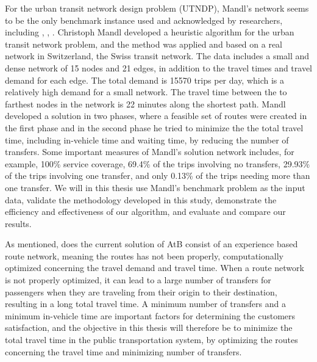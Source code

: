 For the urban transit network design problem (UTNDP), Mandl's network seems to be the only benchmark instance used and acknowledged by researchers, including \citep{fan09}, \citep{kechagiopoulos14}, \citep{nikolic14}. Christoph Mandl \citep{mandl79} developed a heuristic algorithm for the urban transit network problem, and the method was applied and based on a real network in Switzerland, the Swiss transit network\citep{mandl80}. The data includes a small and dense network of 15 nodes and 21 edges, in addition to the travel times and travel demand for each edge. The total demand is 15570 trips per day, which is a relatively high demand for a small network. The travel time between the to farthest nodes in the network is 22 minutes along the shortest path. Mandl developed a solution in two phases, where a feasible set of routes were created in the first phase and in the second phase he tried to minimize the the total travel time, including in-vehicle time and waiting time, by reducing the number of transfers. Some important measures of Mandl's solution network includes, for example, 100\% service coverage, 69.4\% of the trips involving no transfers, 29.93\% of the trips involving one transfer, and only 0.13\% of the trips needing more than one transfer. We will in this thesis use Mandl's benchmark problem \citep{mandl79} as the input data, validate the methodology developed in this study, demonstrate the efficiency and effectiveness of our algorithm, and evaluate and compare our results. 


As mentioned, does the current solution of AtB consist of an experience based route network, meaning the routes has not been properly, computationally optimized concerning the travel demand and travel time. When a route network is not properly optimized, it can lead to a large number of transfers for passengers when they are traveling from their origin to their destination, resulting in a long total travel time. A minimum number of transfers and a minimum in-vehicle time are important factors for determining the customers satisfaction, and the objective in this thesis will therefore be to minimize the total travel time in the public transportation system, by optimizing the routes concerning the travel time and minimizing number of transfers. %

